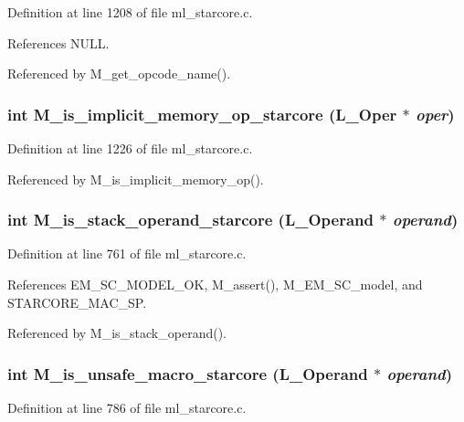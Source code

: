 Definition at line 1208 of file ml\_\-starcore.c.

References NULL.

Referenced by M\_\-get\_\-opcode\_\-name().
\subsubsection{\setlength{\rightskip}{0pt plus 5cm}int M\_\-is\_\-implicit\_\-memory\_\-op\_\-starcore (L\_\-Oper $\ast$ {\em oper})}\label{m__starcore_8h_9c9bfd447830985e2116d61e5435cc5b}




Definition at line 1226 of file ml\_\-starcore.c.

Referenced by M\_\-is\_\-implicit\_\-memory\_\-op().
\subsubsection{\setlength{\rightskip}{0pt plus 5cm}int M\_\-is\_\-stack\_\-operand\_\-starcore (L\_\-Operand $\ast$ {\em operand})}\label{m__starcore_8h_ac6b35a14f04c7cfba9694df3dcfd595}




Definition at line 761 of file ml\_\-starcore.c.

References EM\_\-SC\_\-MODEL\_\-OK, M\_\-assert(), M\_\-EM\_\-SC\_\-model, and STARCORE\_\-MAC\_\-SP.

Referenced by M\_\-is\_\-stack\_\-operand().
\subsubsection{\setlength{\rightskip}{0pt plus 5cm}int M\_\-is\_\-unsafe\_\-macro\_\-starcore (L\_\-Operand $\ast$ {\em operand})}\label{m__starcore_8h_4a9938a045c1c7f45d9f19ab6c5f6114}




Definition at line 786 of file ml\_\-starcore.c.

